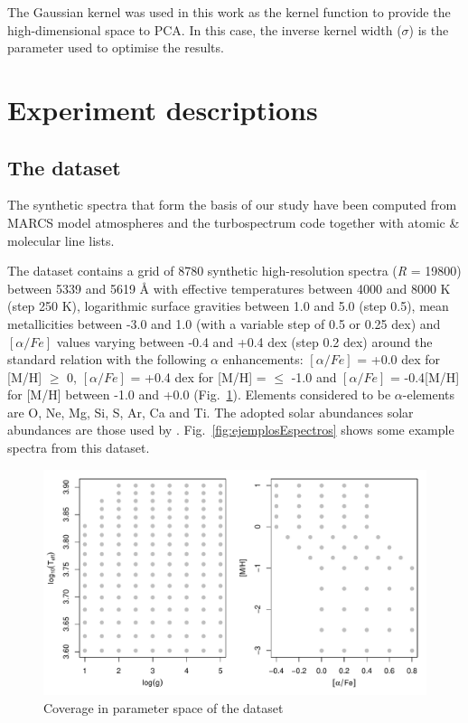 \documentclass[a4paper,fleqn,usenatbib]{mnras}
\begin{document}
{The Gaussian kernel was used in this work as the kernel function 
to provide the high-dimensional space to PCA. In this case, the 
inverse kernel width ($\sigma$) is the parameter used to optimise 
the results. 
 

\section{Experiment descriptions}
\label{sec:experiment}
\subsection{The dataset}

The synthetic spectra that form the basis of our study have been
computed from MARCS model atmospheres \citep{gustafsson:08} and the
turbospectrum code \citep{alvarez:98, plez:12} together with atomic \&
molecular line lists.

The dataset contains a grid of 8780 synthetic high-resolution spectra
(\textit{R} = 19800) between 5339 and 5619 {\AA}
with effective temperatures between 4000 and 8000 K (step 250 K),
logarithmic surface gravities between 1.0 and 5.0 (step 0.5), mean
metallicities between -3.0 and 1.0 (with a variable step of 0.5 or
0.25 dex) and $\left[ \alpha/Fe \right]$ values varying between -0.4
and +0.4 dex (step 0.2 dex) around the standard relation with the
following $\alpha$ enhancements: $\left[ \alpha/Fe \right]$ = +0.0 dex
for [M/H] $\geqslant$ 0, $\left[ \alpha/Fe \right]$ = +0.4 dex for
[M/H] = $\leqslant$ -1.0 and $\left[ \alpha/Fe \right]$ = -0.4[M/H]
for [M/H] between -1.0 and +0.0 (Fig.~\ref{fig:gridModelos}).  
Elements considered to be $\alpha$-elements are O, Ne, Mg, Si, S, 
Ar, Ca and Ti. The adopted solar abundances solar abundances are those 
used by \citep{gustafsson:08}.
Fig.~\ref{fig:ejemplosEspectros} shows some example spectra 
from this dataset.

\begin{figure}
\centering\includegraphics[width=\columnwidth]{grid_modelos.pdf}
\caption{Coverage in parameter space of the dataset}
\label{fig:gridModelos}
\end{figure}

}
\end{document}
